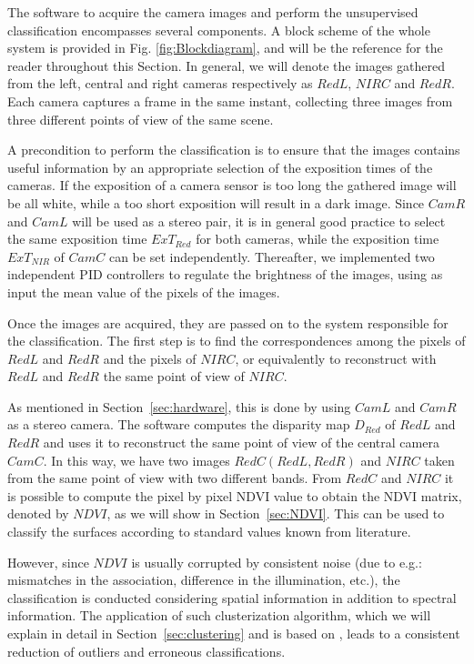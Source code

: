 \documentclass[a4paper, 10pt, conference]{ieeeconf}      %
\begin{document}
The software to acquire the camera images and perform the unsupervised classification encompasses several components.
A block scheme of the whole system is provided in Fig. \ref{fig:Blockdiagram}, and will be the reference for the reader throughout this Section.
In general, we will denote the images gathered from the left, central and right cameras respectively as $RedL$, $NIRC$ and $RedR$.
Each camera captures a frame in the same instant, collecting three images from three different points of view of the same scene.

A precondition to perform the classification is to ensure that the images contains useful information by an appropriate selection of the exposition times of the cameras.
If the exposition of a camera sensor is too long the gathered image will be all white, while a too short exposition will result in a dark image.
Since $CamR$ and $CamL$ will be used as a  stereo pair, it is in general good practice to select the same exposition time $ExT_{Red}$ for both cameras, while the exposition time $ExT_{NIR}$ of $CamC$ can be set independently.
Thereafter, we implemented two independent  PID controllers to regulate the brightness of the images, using as input the mean value of the pixels of the images.



Once the images are acquired, they are passed on to the system responsible for the classification.
The first step is to find the correspondences among the pixels of $RedL$ and $RedR$ and the pixels of $NIRC$, or equivalently to reconstruct with $RedL$ and $RedR$ the same point of view of $NIRC$.

As mentioned in Section~\ref{sec:hardware}, this is done by using $CamL$ and $CamR$ as a stereo camera.
The software computes the disparity map $D_{Red}$ of $RedL$ and $RedR$ and uses it to reconstruct the same point of view of the central camera $CamC$.
In this way, we have two images $RedC(RedL, RedR)$ and $NIRC$ taken from the same point of view with two different bands.
From $RedC$ and $NIRC$ it is possible to compute the pixel by pixel NDVI value to obtain the NDVI matrix, denoted by $NDVI$, as we will show in Section~\ref{sec:NDVI}.
This can be used to classify the surfaces according to standard values known from literature.

However, since $NDVI$ is usually corrupted by consistent noise (due to e.g.: mismatches in the association, difference in the illumination, etc.), the classification is conducted considering spatial information in addition to spectral information.
The application of such clusterization algorithm, which we will explain in detail in Section~\ref{sec:clustering} and is based on \cite{1997_Wiemker}, leads to a consistent reduction of outliers and erroneous classifications. 
\end{document}
